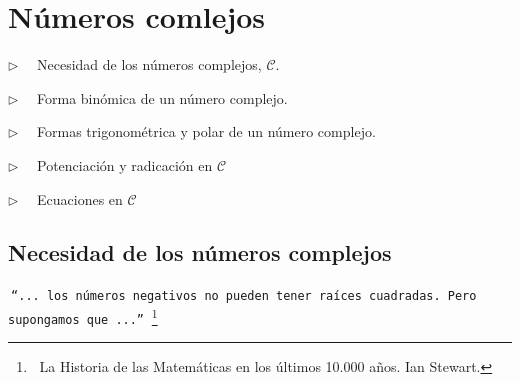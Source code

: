 \chapter{Números comlejos} \label{complejos}



\vspace{10mm}


\begin{adjustwidth}{40pt}{40pt}
\begin{cuadro-gris}

	\begin{multicols}{2}
	$\triangleright \quad$   Necesidad de los números complejos, $\mathcal C$.
	
	$\triangleright \quad$   Forma binómica de un número complejo.
	
	$\triangleright \quad$   Formas trigonométrica y polar de un número complejo.
	
	$\triangleright \quad$   Potenciación y radicación en $\mathcal C$

	$\triangleright \quad$   Ecuaciones en $\mathcal C$
	
	\end{multicols}
	
\end{cuadro-gris}
\end{adjustwidth}


\vspace{.5cm}
\section{Necesidad de los números complejos}
\vspace{0.5cm}



\begin{adjustwidth}{40pt}{40pt}
\begin{destacado}
\texttt{$\ $``... los números negativos no pueden tener raíces cuadradas. Pero supongamos que ...''$\ $}
\footnote{$\ $ La Historia de las Matemáticas en los últimos 10.000 años. Ian Stewart.}
\end{destacado}
\end{adjustwidth}

